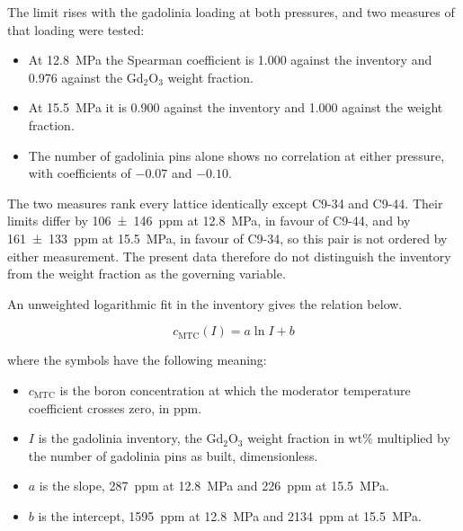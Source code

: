 The limit rises with the gadolinia loading at both pressures, and two
measures of that loading were tested:

\begin{itemize}
  \item At \SI{12.8}{MPa} the Spearman coefficient is 1.000 against the
        inventory and 0.976 against the Gd$_2$O$_3$ weight fraction.

  \item At \SI{15.5}{MPa} it is 0.900 against the inventory and 1.000
        against the weight fraction.

  \item The number of gadolinia pins alone shows no correlation at
        either pressure, with coefficients of $-0.07$ and $-0.10$.
\end{itemize}

The two measures rank every lattice identically except C9-34 and C9-44.
Their limits differ by \SI{106(146)}{ppm} at \SI{12.8}{MPa}, in favour
of C9-44, and by \SI{161(133)}{ppm} at \SI{15.5}{MPa}, in favour of
C9-34, so this pair is not ordered by either measurement. The present
data therefore do not distinguish the inventory from the weight fraction
as the governing variable.

An unweighted logarithmic fit in the inventory gives the relation below.

\begin{equation}
  c_\mathrm{MTC}(I) = a \ln I + b
  \label{eq:mtc-ceiling-fit}
\end{equation}

\noindent where the symbols have the following meaning:

\begin{itemize}
  \item $c_\mathrm{MTC}$ is the boron concentration at which the
        moderator temperature coefficient crosses zero, in ppm.

  \item $I$ is the gadolinia inventory, the Gd$_2$O$_3$ weight fraction
        in wt\% multiplied by the number of gadolinia pins as built,
        dimensionless.

  \item $a$ is the slope, \SI{287}{ppm} at \SI{12.8}{MPa} and
        \SI{226}{ppm} at \SI{15.5}{MPa}.

  \item $b$ is the intercept, \SI{1595}{ppm} at \SI{12.8}{MPa} and
        \SI{2134}{ppm} at \SI{15.5}{MPa}.
\end{itemize}

